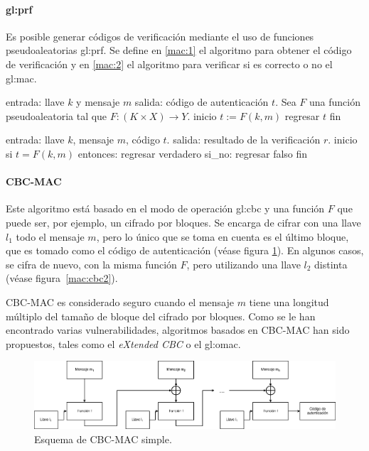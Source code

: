 \paragraph{\texorpdfstring{\acrlong{gl:prf}}{Función pseudoaleatoria}}
Es posible generar códigos de verificación mediante el uso de funciones
pseudoaleatorias \gls{gl:prf}. Se define en \ref{mac:1} el algoritmo para
obtener el código de verificación y en \ref{mac:2} el algoritmo para verificar
si es correcto o no el \gls{gl:mac}.

\begin{pseudocodigo}[caption={\gls{gl:mac} mediante \gls{gl:prf}, obtener código.},
  label={mac:1}]
    entrada:    llave $k$ y mensaje $m$
    salida:     código de autenticación $t$.
    Sea $F$ una función pseudoaleatoria tal que $F:(K \times X) \rightarrow Y$.
    inicio
      $t := F(k,m)$
      regresar $t$
    fin
\end{pseudocodigo}

\begin{pseudocodigo}[caption={\gls{gl:mac} mediante \gls{gl:prf}, verificar código.},
  label={mac:2}]
    entrada:    llave $k$, mensaje $m$, código $t$.
    salida:     resultado de la verificación $r$.
    inicio
      si $t = F(k,m)$ entonces:
        regresar verdadero
      si_no:
        regresar falso
    fin
\end{pseudocodigo}

\paragraph{CBC-MAC}
Este algoritmo está basado en el modo de operación \gls{gl:cbc} y una función
$F$ que puede ser, por ejemplo, un cifrado por bloques. Se encarga de
cifrar con una llave $l_1$ todo el mensaje $m$, pero lo único que se toma en
cuenta es el último bloque, que es tomado como el código de autenticación
(véase figura \ref{mac:cbc1}). En algunos casos, se cifra de nuevo, con la misma
función $F$, pero utilizando una llave $l_2$ distinta (véase
figura~\ref{mac:cbc2}).

CBC-MAC es considerado seguro cuando el mensaje $m$ tiene una longitud
múltiplo del tamaño de bloque del cifrado por bloques. Como se le han
encontrado varias vulnerabilidades, algoritmos basados en CBC-MAC han sido
propuestos, tales como el \textit{eXtended CBC} o el \gls{gl:omac}.

\begin{figure}
  \begin{center}
    \includegraphics[width=0.9\linewidth]{diagramas/cbcmac.png}
    \caption{Esquema de CBC-MAC simple.}
    \label{mac:cbc1}
  \end{center}
\end{figure}

